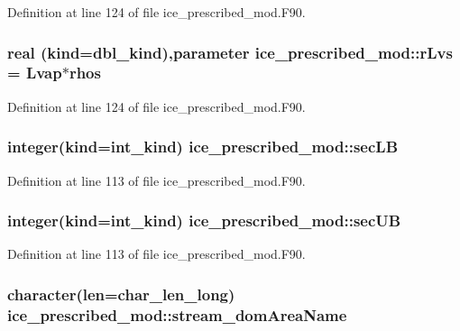 Definition at line 124 of file ice\_\-prescribed\_\-mod.F90.\hypertarget{namespaceice__prescribed__mod_a4dfc1b519ac719ccd1df0821e2ee9d05}{
\subsubsection[{rLvs}]{\setlength{\rightskip}{0pt plus 5cm}real (kind=dbl\_\-kind),parameter {\bf ice\_\-prescribed\_\-mod::rLvs} = Lvap$\ast$rhos}}
\label{namespaceice__prescribed__mod_a4dfc1b519ac719ccd1df0821e2ee9d05}


Definition at line 124 of file ice\_\-prescribed\_\-mod.F90.\hypertarget{namespaceice__prescribed__mod_a1b7b4c13bf3d78d72c62fe92a9a7ebcc}{
\subsubsection[{secLB}]{\setlength{\rightskip}{0pt plus 5cm}integer(kind=int\_\-kind) {\bf ice\_\-prescribed\_\-mod::secLB}}}
\label{namespaceice__prescribed__mod_a1b7b4c13bf3d78d72c62fe92a9a7ebcc}


Definition at line 113 of file ice\_\-prescribed\_\-mod.F90.\hypertarget{namespaceice__prescribed__mod_a23c0dbac49b47681dc4939a3f8fd4100}{
\subsubsection[{secUB}]{\setlength{\rightskip}{0pt plus 5cm}integer(kind=int\_\-kind) {\bf ice\_\-prescribed\_\-mod::secUB}}}
\label{namespaceice__prescribed__mod_a23c0dbac49b47681dc4939a3f8fd4100}


Definition at line 113 of file ice\_\-prescribed\_\-mod.F90.\hypertarget{namespaceice__prescribed__mod_a4c5e8c8c8c573e69e00039703e28a83f}{
\subsubsection[{stream\_\-domAreaName}]{\setlength{\rightskip}{0pt plus 5cm}character(len=char\_\-len\_\-long) {\bf ice\_\-prescribed\_\-mod::stream\_\-domAreaName}}}
\label{namespaceice__prescribed__mod_a4c5e8c8c8c573e69e00039703e28a83f}


